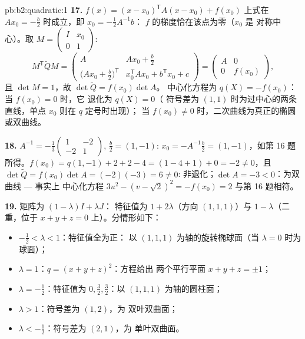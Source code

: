 \begin{solution}{pb:b2:quadratic:1}
\textbf{17.} $f(x) = (x - x_0)^{\mathsf T}A(x - x_0) + f(x_0)$
上式在 $Ax_0 = -\frac b2$ 时成立，即 $x_0 = -\frac12A^{-1}b$：
$f$ 的梯度恰在该点为零（$x_0$ 是
对称中心）。取 $M = \begin{pmatrix} I & x_0\\ 0 &
1\end{pmatrix}$:
\[
M^{\mathsf T}\widetilde QM
= \begin{pmatrix}
A & Ax_0 + \frac b2\\[2pt]
\bigl(Ax_0 + \frac b2\bigr)^{\mathsf T} &
x_0^{\mathsf T}Ax_0 + b^{\mathsf T}x_0 + c
\end{pmatrix}
= \begin{pmatrix} A & 0\\ 0 & f(x_0)\end{pmatrix},
\]
且 $\det M = 1$，故 $\det\widetilde Q = f(x_0)\det A$。
中心化方程为 $q(X) = -f(x_0)$：当 $f(x_0) = 0$ 时，它
退化为 $q(X) = 0$（
符号差为 $(1,1)$ 时为过中心的两条直线，单点 $x_0$ 则在 $q$ 定号时出现）；
当 $f(x_0) \neq 0$ 时，二次曲线为真正的椭圆
或双曲线。

\textbf{18.} $A^{-1} = -\frac13\begin{pmatrix} 1 & -2\\ -2 &
1\end{pmatrix}$, $\frac b2 = (1, -1)$: $x_0 =
-A^{-1}\frac b2 = (1, -1)$，如第 16 题所得。$f(x_0) =
q(1,-1) + 2 + 2 - 4 = (1 - 4 + 1) + 0 = -2 \neq 0$，且
$\det\widetilde Q = f(x_0)\det A = (-2)(-3) = 6 \neq 0$:
非退化；$\det A = -3 < 0$：为双曲线 --- 事实上
中心化方程 $3u^2 - (v - \sqrt2)^2 = -f(x_0) = 2$
与第 16 题相符。

\textbf{19.} 矩阵为 $(1-\lambda)I + \lambda J$：
特征值为 $1 + 2\lambda$（方向 $(1,1,1)$）与 $1 -
\lambda$（二重，位于 $x + y + z = 0$ 上）。分情形如下：
\begin{itemize}
  \item $-\frac12 < \lambda < 1$：特征值全为正：
        以 $(1,1,1)$ 为轴的旋转椭球面（当
        $\lambda = 0$ 时为球面）；
  \item $\lambda = 1$：$q = (x+y+z)^2$：方程给出
        两个平行平面 $x + y + z = \pm1$；
  \item $\lambda = -\frac12$：特征值为 $0, \frac32,
        \frac32$：以 $(1,1,1)$ 为轴的圆柱面；
  \item $\lambda > 1$：符号差为 $(1, 2)$，为
        双叶双曲面；
  \item $\lambda < -\frac12$：符号差为 $(2, 1)$，为
        单叶双曲面。
\end{itemize}


\end{solution}
